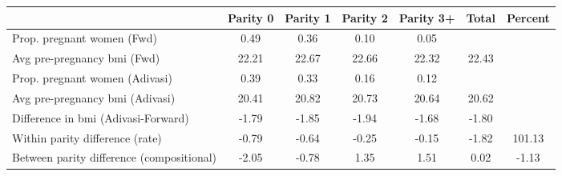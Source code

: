 \begin{tabular}{l*{6}{c}}
\toprule
            &\multicolumn{1}{c}{Parity 0}&\multicolumn{1}{c}{Parity 1}&\multicolumn{1}{c}{Parity 2}&\multicolumn{1}{c}{Parity 3+}&\multicolumn{1}{c}{Total}&\multicolumn{1}{c}{Percent}\\
\midrule
\midrule
Prop. pregnant women (Fwd)&        0.49&        0.36&        0.10&        0.05&            &            \\
Avg pre-pregnancy bmi (Fwd)&       22.21&       22.67&       22.66&       22.32&       22.43&            \\
Prop. pregnant women (Adivasi)&        0.39&        0.33&        0.16&        0.12&            &            \\
Avg pre-pregnancy bmi (Adivasi)&       20.41&       20.82&       20.73&       20.64&       20.62&            \\
Difference in bmi (Adivasi-Forward)&       -1.79&       -1.85&       -1.94&       -1.68&       -1.80&            \\
Within parity difference (rate)&       -0.79&       -0.64&       -0.25&       -0.15&       -1.82&      101.13\\
Between parity difference (compositional)&       -2.05&       -0.78&        1.35&        1.51&        0.02&       -1.13\\
\bottomrule
\end{tabular}
